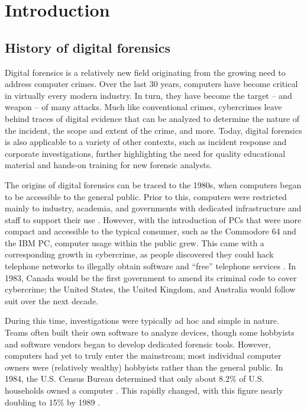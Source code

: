 \documentclass[letterpaper,12pt]{report}
\begin{document}
\newpage
\renewcommand{\lstlistlistingname}{List of Code Listings}
\lstlistoflistings

\newpage
{}
\setcounter{page}{1}
\linespread{2}

\chapter{Introduction}\label{chapter-one}

\section{History of digital
forensics}\label{history-of-digital-forensics}

Digital forensics is a relatively new field originating from the growing
need to address computer crimes. Over the last 30 years, computers have
become critical in virtually every modern industry. In turn, they have
become the target -- and weapon -- of many attacks. Much like
conventional crimes, cybercrimes leave behind traces of digital evidence
that can be analyzed to determine the nature of the incident, the scope
and extent of the crime, and more. Today, digital forensics is also
applicable to a variety of other contexts, such as incident response and
corporate investigations, further highlighting the need for quality
educational material and hands-on training for new forensic analysts.

The origins of digital forensics can be traced to the 1980s, when
computers began to be accessible to the general public. Prior to this,
computers were restricted mainly to industry, academia, and governments
with dedicated infrastructure and staff to support their use
\cite{pollittHistoryDigitalForensics2010}. However, with the
introduction of PCs that were more compact and accessible to the typical
consumer, such as the Commodore 64 and the IBM PC, computer usage within
the public grew. This came with a corresponding growth in cybercrime, as
people discovered they could hack telephone networks to illegally obtain
software and ``free'' telephone services
\cite{jonesInsightDigitalForensics2022}. In 1983, Canada would be
the first government to amend its criminal code to cover cybercrime; the
United States, the United Kingdom, and Australia would follow suit over
the next decade.

During this time, investigations were typically ad hoc and simple in
nature. Teams often built their own software to analyze devices, though
some hobbyists and software vendors began to develop dedicated forensic
tools. However, computers had yet to truly enter the mainstream; most
individual computer owners were (relatively wealthy) hobbyists rather
than the general public. In 1984, the U.S. Census Bureau determined that
only about 8.2\% of U.S. households owned a computer
\cite{robertkominskiComputerUseUnited1988}. This rapidly changed,
with this figure nearly doubling to 15\% by 1989
\cite{robertkominskiComputerUseUnited1991}.
\end{document}
